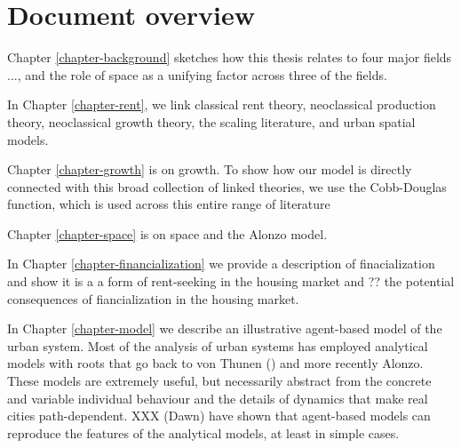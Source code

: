 \section{Document overview}

Chapter \ref{chapter-background} sketches how this thesis relates to four major fields ..., and the role of space as a unifying factor across three of the fields.

In Chapter \ref{chapter-rent}, we link classical rent theory, neoclassical production theory, neoclassical growth theory, the scaling literature, and urban spatial models.

Chapter \ref{chapter-growth} is on growth. To show how our model is directly connected with this broad collection of linked theories, we use the Cobb-Douglas function, which is used across this entire range of literature 



Chapter \ref{chapter-space} is on space and the Alonzo model.

In Chapter \ref{chapter-financialization} we  provide a description of finacialization and show it is a a form of rent-seeking in the housing market and ?? the potential consequences of fiancialization in the housing market. 

In Chapter \ref{chapter-model} we  describe an illustrative agent-based model of the urban system. Most of the analysis of urban systems has employed analytical models with roots that go back to von Thunen () and more recently Alonzo. These models are extremely useful, but necessarily abstract from the concrete  and variable individual behaviour and  the details  of dynamics that make real cities path-dependent. XXX (Dawn) have shown that agent-based models can reproduce the features of the analytical models, at least in simple cases. 




